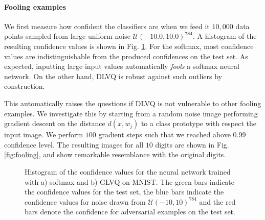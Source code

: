 \documentclass{esannV2}
\begin{document}
\paragraph{Fooling examples}
We first measure how confident the classifiers are when we feed it $10,000$ data points sampled from large uniform noise $\mathcal{U}(-10.0, 10.0)^{784}$. A histogram of the resulting confidence values is shown in Fig. \ref{fig:confidence}. For the softmax, most confidence values are indistinguishable from the produced confidences on the test set. As expected,  inputting large input values automatically \emph{fools} a softmax neural network. On the other hand, DLVQ is robust against such outliers by construction. 

This automatically raises the questions if DLVQ is not vulnerable to other fooling examples. We investigate this by starting from a random noise image performing gradient descent on the distance $d(x, w_j)$ to a class prototype with respect the input image. We perform $100$ gradient steps such that we reached above $0.99$ confidence level. The resulting images for all $10$ digits are shown in Fig.\ref{fig:fooling}, and show remarkable resemblance with the original digits. 


\begin{figure}[t]
\caption{Histogram of the confidence values for the neural network trained with a) softmax and b) GLVQ on MNIST. The green bars indicate the confidence values for the test set, the blue bars indicate the confidence values for noise drawn from $\mathcal{U}(-10, 10)^{784}$ and the red bars denote the confidence for adversarial examples on the test set.}
\label{fig:confidence}
\end{figure}
\end{document}
